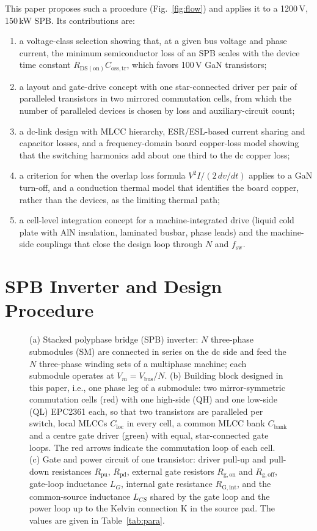 \documentclass[conference]{IEEEtran}
\begin{document}
This paper proposes such a procedure (Fig.~\ref{fig:flow}) and applies it to a 1200\,V, 150\,kW SPB. Its contributions are:
\begin{enumerate}
\item a voltage-class selection showing that, at a given bus voltage and phase current, the minimum semiconductor loss of an SPB scales with the device time constant $R_\mathrm{DS(on)}C_\mathrm{oss,tr}$, which favors 100\,V GaN transistors;
\item a layout and gate-drive concept with one star-connected driver per pair of paralleled transistors in two mirrored commutation cells, from which the number of paralleled devices is chosen by loss and auxiliary-circuit count;
\item a dc-link design with MLCC hierarchy, ESR/ESL-based current sharing and capacitor losses, and a frequency-domain board copper-loss model showing that the switching harmonics add about one third to the dc copper loss;
\item a criterion for when the overlap loss formula $V^2I/(2\,dv/dt)$ applies to a GaN turn-off, and a conduction thermal model that identifies the board copper, rather than the devices, as the limiting thermal path;
\item a cell-level integration concept for a machine-integrated drive (liquid cold plate with AlN insulation, laminated busbar, phase leads) and the machine-side couplings that close the design loop through $N$ and $f_\mathrm{sw}$.
\end{enumerate}

\section{SPB Inverter and Design Procedure}
\begin{figure}[t]
\centering
\resizebox{\textwidth}{!}{}
\caption{(a) Stacked polyphase bridge (SPB) inverter: $N$ three-phase submodules (SM) are connected in series on the dc side and feed the $N$ three-phase winding sets of a multiphase machine; each submodule operates at $V_m=V_\mathrm{bus}/N$. (b) Building block designed in this paper, i.e., one phase leg of a submodule: two mirror-symmetric commutation cells (red) with one high-side (QH) and one low-side (QL) EPC2361 each, so that two transistors are paralleled per switch, local MLCCs $C_\mathrm{loc}$ in every cell, a common MLCC bank $C_\mathrm{bank}$ and a centre gate driver (green) with equal, star-connected gate loops. The red arrows indicate the commutation loop of each cell. (c) Gate and power circuit of one transistor: driver pull-up and pull-down resistances $R_\mathrm{pu}$, $R_\mathrm{pd}$, external gate resistors $R_\mathrm{g,on}$ and $R_\mathrm{g,off}$, gate-loop inductance $L_G$, internal gate resistance $R_\mathrm{G,int}$, and the common-source inductance $L_{CS}$ shared by the gate loop and the power loop up to the Kelvin connection K in the source pad. The values are given in Table~\ref{tab:para}.}
\label{fig:spb}
\end{figure}
\end{document}
